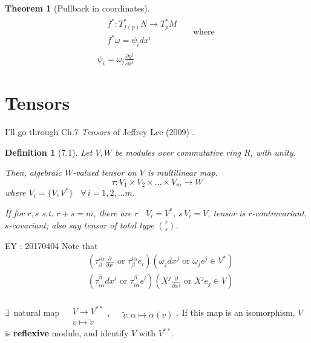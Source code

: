 \documentclass[10pt]{amsart}
\newtheorem{theorem}{Theorem}
\newtheorem{definition}{Definition}
\begin{document}
\begin{multicols*}{2}
\begin{theorem}[Pullback in coordinates]
\begin{equation}
	\boxed{ 
\begin{gathered} 
\begin{aligned}
& f^* : T^*_{f(p)}N \to T^*_p M \\
& f^* \omega = \psi_i dx^i
\end{aligned} \quad \, \text{ where }  \\
\psi_i = \omega_j \frac{ \partial y^j}{ \partial x^i} 
\end{gathered}
}
\end{equation}	
\end{theorem} 

\section{Tensors}

I'll go through Ch.7 \emph{Tensors} of Jeffrey Lee (2009) \cite{JLee2009}.  

\begin{definition}[7.1\cite{JLee2009}] Let $V,W$ be modules over commutative ring $R$, with unity.  

Then, algebraic $W$-valued tensor on $V$ is multilinear map.  
\begin{equation}
	\tau: V_1 \times V_2 \times \dots \times V_m \to W
\end{equation}
where $V_i = \lbrace V,V^* \rbrace$ \quad \, $ \forall \, i=1,2,\dots m$.  

If for $r,s$ s.t. $r+s =m$, there are $r$ \, $V_i = V^*$, $s \, V_i = V$, tensor is $r$-contravariant, $s$-covariant; also say tensor of total type $\binom{r}{s}$.  
\end{definition}

EY : 20170404 Note that 
\[
\begin{aligned}
	& ( \tau_{\beta}^{i\alpha} \frac{ \partial }{ \partial x^i } \text{ or } \tau_{\beta}^{i\alpha} e_i )(\omega_j dx^j \text{ or } \omega_je^j  \in V^*) \\ 
	& ( \tau^{\beta}_{i\alpha} dx^i \text{ or } \tau^{\beta}_{i\alpha} e^i )( X^j \frac{ \partial }{ \partial x^j} \text{ or } X^j e_j  \in V) 
\end{aligned}
\]

$\exists \,$ natural map $\begin{aligned} & \quad \\ 
	& V\to V^{**} \\ 
& v \mapsto \widetilde{v} \end{aligned}$,  $\begin{aligned} & \quad \\ 
	& \widetilde{v} : \alpha \mapsto \alpha(v) \end{aligned}$.  If this map is an isomorphism, $V$ is \textbf{reflexive} module, and identify $V$ with $V^{**}$.  


\end{multicols*}
\end{document}
